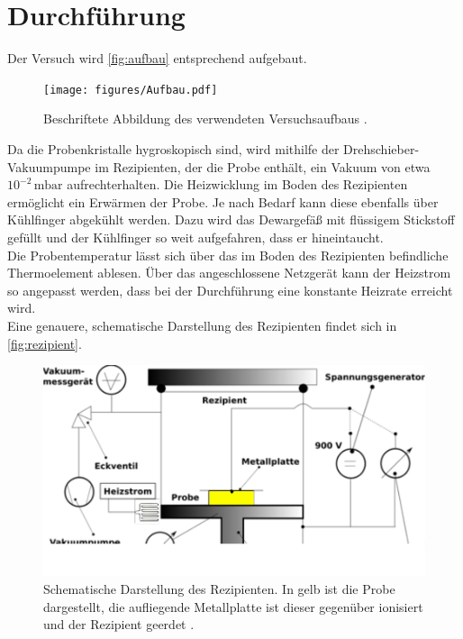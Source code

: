 \section{Durchführung}
\label{sec:Durchführung}

Der Versuch wird \autoref{fig:aufbau} entsprechend aufgebaut.

\begin{figure}[H]
    \centering
    \texttt{[image: figures/Aufbau.pdf]}
    \caption{Beschriftete Abbildung des verwendeten Versuchsaufbaus \cite{v48}.}
    \label{fig:aufbau}
\end{figure}

Da die Probenkristalle hygroskopisch sind, wird mithilfe der Drehschieber-Vakuumpumpe im Rezipienten, der die Probe enthält, ein Vakuum von etwa $10^{-2} \,\si{\milli\bar}$ aufrechterhalten. 
Die Heizwicklung im Boden des Rezipienten ermöglicht ein Erwärmen der Probe.
Je nach Bedarf kann diese ebenfalls über Kühlfinger abgekühlt werden. Dazu wird das Dewargefäß mit flüssigem Stickstoff gefüllt und der Kühlfinger so weit aufgefahren, dass er hineintaucht. \\
Die Probentemperatur lässt sich über das im Boden des Rezipienten befindliche Thermoelement ablesen.
Über das angeschlossene Netzgerät kann der Heizstrom so angepasst werden, dass bei der Durchführung eine konstante Heizrate erreicht wird. \\
Eine genauere, schematische Darstellung des Rezipienten findet sich in \autoref{fig:rezipient}.

\begin{figure}[H]
    \centering
    \includegraphics[]{figures/Rezipient.pdf}
    \caption{Schematische Darstellung des Rezipienten. In gelb ist die Probe dargestellt, die aufliegende Metallplatte ist dieser gegenüber ionisiert und der Rezipient geerdet \cite{v48}.}
    \label{fig:rezipient}
\end{figure}

